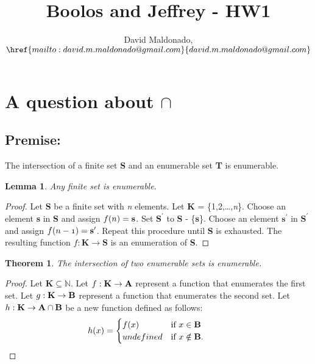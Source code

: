 \documentclass[a4paper,11pt]{article}
\author{David Maldonado, $\href{mailto:david.m.maldonado@gmail.com}%
{david.m.maldonado@gmail.com}$}
\title{Boolos and Jeffrey - HW1}
\newtheorem{lem}{Lemma}[section]
\newtheorem{thm}{Theorem}[section]
\begin{document}
\maketitle

\bigskip


\section{A question about $\cap$} 

	\subsection*{Premise:}
	The intersection of a finite set \textbf{S} and an enumerable set \textbf{T} is enumerable.
	
	\bigskip

	\begin{lem}Any finite set is enumerable.\end{lem}
		\begin{proof}
		Let \textbf{S} be a finite set with \textit{n} elements. Let \textbf{K} = \{1,2,\dots,\textit{n}\}. 
		Choose an element \textbf{s} in \textbf{S} and assign $\mathnormal{f(n)} = \textbf{s}$. 
		Set $\textbf{S}^\prime$ to \textbf{S} - \{\textbf{s}\}. Choose an element $\textbf{s}^\prime$ 
		in $\textbf{S}^\prime$ and assign $\mathnormal{f(n-1)} = \textbf{s}^\prime$. 
		Repeat this procedure until \textbf{S} is exhausted. The resulting function $f : \textbf{K} \rightarrow 	
		\textbf{S}$ is an enumeration of \textbf{S}.
		\end{proof}
		
		\bigskip
		
	\begin{thm}The intersection of two enumerable sets is enumerable.\end{thm}
		\begin{proof}
		Let $\textbf{K} \subseteq \mathbb{N}$. Let $\mathnormal{f}: \textbf{K} \rightarrow \textbf{A}$ represent 		a function that enumerates the first set. Let $\mathnormal{g}: \textbf{K} \rightarrow \textbf{B}$ 
		represent a function that enumerates the second set. Let $\mathnormal{h}: \textbf{K} \rightarrow 
		\textbf{A} \cap \textbf{B}$ be a new function defined as follows: 
		\bigskip
		\begin{equation*} \hspace*{-1cm}  h(x) = \begin{cases} f(x) &\mbox{if } x \in \textbf{B} \\ 
		undefined & \mbox{if } x \notin \textbf{B}. \end{cases} \end{equation*}
		\end{proof}
		
\end{document}
